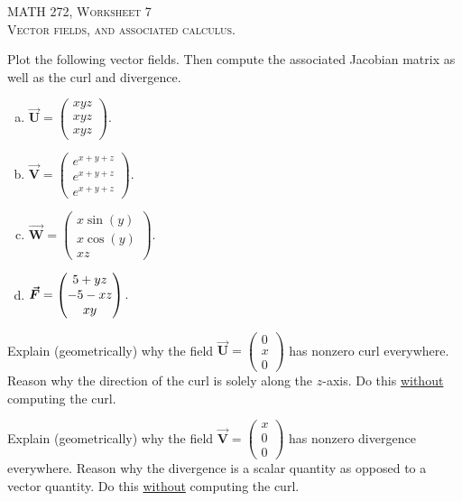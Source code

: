 \documentclass[12pt]{article} %
\newcommand{\vecfieldV}{\boldsymbol{\vec{V}}}
\newcommand{\vecfieldU}{\boldsymbol{\vec{U}}}
\newcommand{\vecfieldW}{\boldsymbol{\vec{W}}}
\begin{document}
\begin{center}
   \textsc{\large MATH 272, Worksheet 7}\\
   \textsc{Vector fields, and associated calculus.}
\end{center}
\vspace{.5cm}

\begin{problem}
Plot the following vector fields. Then compute the associated Jacobian matrix as well as the curl and divergence.
\begin{multicols}{2}
\begin{enumerate}[(a)]
    \item $\vecfieldU = \begin{pmatrix} xyz \\ xyz \\ xyz \end{pmatrix}$.
    \item $\vecfieldV = \begin{pmatrix} e^{x+y+z} \\ e^{x+y+z} \\ e^{x+y+z} \end{pmatrix}$.
    \item $\vecfieldW = \begin{pmatrix} x \sin(y) \\ x \cos(y) \\ xz \end{pmatrix}$.
    \item $\boldsymbol{\vec{F}} = \begin{pmatrix} 5 + yz \\ -5 -xz \\ xy \end{pmatrix}$.
\end{enumerate}
\end{multicols}
\end{problem}

\begin{problem}
    Explain (geometrically) why the field $\vecfieldU = \begin{pmatrix} 0 \\ x \\ 0 \end{pmatrix}$ has nonzero curl everywhere. Reason why the direction of the curl is solely along the $z$-axis.  Do this \underline{without} computing the curl.
\end{problem}

\begin{problem}
    Explain (geometrically) why the field $\vecfieldV = \begin{pmatrix} x \\ 0 \\ 0 \end{pmatrix}$ has nonzero divergence everywhere. Reason why the divergence is a scalar quantity as opposed to a vector quantity. Do this \underline{without} computing the curl.
\end{problem}
\end{document}
